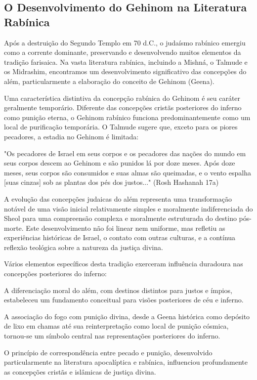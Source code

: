\subsection{O Desenvolvimento do Gehinom na Literatura Rabínica}

Após a destruição do Segundo Templo em 70 d.C., o judaísmo rabínico emergiu como a corrente dominante, preservando e desenvolvendo muitos elementos da tradição farisaica. Na vasta literatura rabínica, incluindo a Mishná, o Talmude e os Midrashim, encontramos um desenvolvimento significativo das concepções do além, particularmente a elaboração do conceito de Gehinom (Geena).

Uma característica distintiva da concepção rabínica do Gehinom é seu caráter geralmente temporário. Diferente das concepções cristãs posteriores do inferno como punição eterna, o Gehinom rabínico funciona predominantemente como um local de purificação temporária. O Talmude sugere que, exceto para os piores pecadores, a estadia no Gehinom é limitada:

"Os pecadores de Israel em seus corpos e os pecadores das nações do mundo em seus corpos descem ao Gehinom e são punidos lá por doze meses. Após doze meses, seus corpos são consumidos e suas almas são queimadas, e o vento espalha [suas cinzas] sob as plantas dos pés dos justos..." (Rosh Hashanah 17a)


A evolução das concepções judaicas do além representa uma transformação notável de uma visão inicial relativamente simples e moralmente indiferenciada do Sheol para uma compreensão complexa e moralmente estruturada do destino pós-morte. Este desenvolvimento não foi linear nem uniforme, mas refletiu as experiências históricas de Israel, o contato com outras culturas, e a contínua reflexão teológica sobre a natureza da justiça divina.

Vários elementos específicos desta tradição exerceram influência duradoura nas concepções posteriores do inferno:

A diferenciação moral do além, com destinos distintos para justos e ímpios, estabeleceu um fundamento conceitual para visões posteriores de céu e inferno.

A associação do fogo com punição divina, desde a Geena histórica como depósito de lixo em chamas até sua reinterpretação como local de punição cósmica, tornou-se um símbolo central nas representações posteriores do inferno.

O princípio de correspondência entre pecado e punição, desenvolvido particularmente na literatura apocalíptica e rabínica, influenciou profundamente as concepções cristãs e islâmicas de justiça divina.

